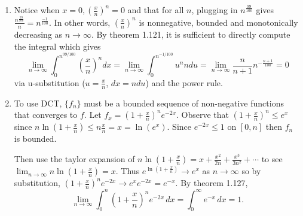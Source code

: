 \documentclass[11pt]{article}
\begin{document}
\begin{enumerate}[leftmargin=*, label=\textbf{\arabic*.}]
	      \begin{enumerate}
		      \item Notice when $x = 0, (\frac{x}{n})^n = 0$ and that for all $n$, plugging in $n^{\frac{99}{100}}$ gives
		            $\frac{n^{\frac{99}{100}}}{n} = n^{\frac{-1}{100}}$. In other words, $(\frac{x}{n})^n$ is nonnegative, bounded and monotonically decreasing as $n\to \infty$. By theorem 1.121, it is sufficient to directly compute the integral which gives
		            $$ \lim_{n\to\infty}\int_0^{n^{99/100}} (\frac{x}{n})^n dx = \lim_{n\to\infty}\int_0^{n^{-1/100}}u^n ndu = \lim_{n\to \infty} \frac{n}{n+1}n^{-\frac{n+1}{100}} = 0$$
		            via u-substitution ($u = \frac{x}{n}$, $dx = ndu$) and the power rule.
		      \item To use DCT, $\{f_n\}$ must be a bounded sequence of non-negative functions that converges to $f$. Let $f_x = (1 + \frac{x}{n})^n e^{-2x}.$ Observe that
		            $(1 + \frac{x}{n})^n \leq e^x$ since $n\ln(1+\frac{x}{n}) \leq n \frac{x}{n} = x = \ln(e^x).$ Since $e^{-2x}  \leq 1$ on $[0,n]$ then $f_n$ is bounded.

		            Then use the taylor expansion of $n\ln(1+\frac{x}{n}) = x + \frac{x^2}{2n} + \frac{x^3}{3n^2} + \cdots$ to see
		            $\lim_{n\to \infty} n\ln(1+\frac{x}{n}) = x.$ Thus $e^{\ln(1+\frac{x}{n})} \to e^x$ as $n\to \infty$ so by substitution,
		            $(1 + \frac{x}{n})^n e^{-2x} \to e^xe^{-2x} = e^{-x}.$ By theorem 1.127,
		            $$\lim_{n\to \infty} \int_0^n \left(1 + \frac{x}{n}\right)^n e^{-2x}\, dx = \int_0^\infty e^{-x}\, dx = 1.$$


	      \end{enumerate}

\end{enumerate}
\end{document}

